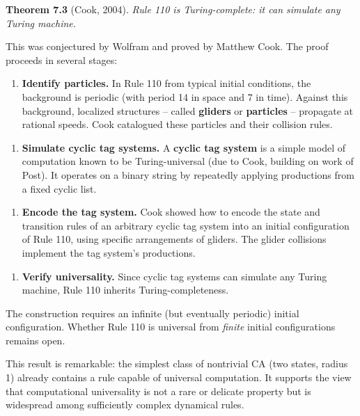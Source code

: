 \textbf{Theorem 7.3} (Cook, 2004). \textit{Rule 110 is Turing-complete: it can simulate any Turing machine.}

This was conjectured by Wolfram and proved by Matthew Cook. The proof proceeds in several stages:

\begin{enumerate}
  \item \textbf{Identify particles.} In Rule 110 from typical initial conditions, the background is periodic (with period 14 in space and 7 in time). Against this background, localized structures -- called \textbf{gliders} or \textbf{particles} -- propagate at rational speeds. Cook catalogued these particles and their collision rules.
\end{enumerate}

\begin{enumerate}
  \item \textbf{Simulate cyclic tag systems.} A \textbf{cyclic tag system} is a simple model of computation known to be Turing-universal (due to Cook, building on work of Post). It operates on a binary string by repeatedly applying productions from a fixed cyclic list.
\end{enumerate}

\begin{enumerate}
  \item \textbf{Encode the tag system.} Cook showed how to encode the state and transition rules of an arbitrary cyclic tag system into an initial configuration of Rule 110, using specific arrangements of gliders. The glider collisions implement the tag system's productions.
\end{enumerate}

\begin{enumerate}
  \item \textbf{Verify universality.} Since cyclic tag systems can simulate any Turing machine, Rule 110 inherits Turing-completeness.
\end{enumerate}

The construction requires an infinite (but eventually periodic) initial configuration. Whether Rule 110 is universal from \textit{finite} initial configurations remains open.

This result is remarkable: the simplest class of nontrivial CA (two states, radius 1) already contains a rule capable of universal computation. It supports the view that computational universality is not a rare or delicate property but is widespread among sufficiently complex dynamical rules.


